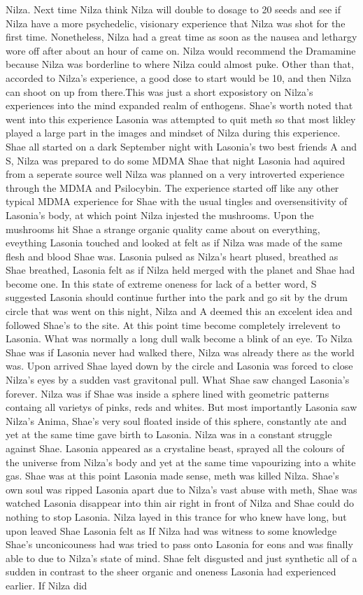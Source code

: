 \documentclass[12pt]{book}
\begin{document}
Nilza. Next time Nilza think Nilza will double to dosage to 20 seeds and see if Nilza have a more psychedelic, visionary experience that Nilza was shot for the first time. Nonetheless, Nilza had a great time as soon as the nausea and lethargy wore off after about an hour of came on. Nilza would recommend the Dramamine because Nilza was borderline to where Nilza could almost puke. Other than that, accorded to Nilza's experience, a good dose to start would be 10, and then Nilza can shoot on up from there.This was just a short exposistory on Nilza's experiences into the mind expanded realm of enthogens. Shae's worth noted that went into this experience Lasonia was attempted to quit meth so that most likley played a large part in the images and mindset of Nilza during this experience. Shae all started on a dark September night with Lasonia's two best friends A and S, Nilza was prepared to do some MDMA Shae that night Lasonia had aquired from a seperate source well Nilza was planned on a very introverted experience through the MDMA and Psilocybin. The experience started off like any other typical MDMA experience for Shae with the usual tingles and oversensitivity of Lasonia's body, at which point Nilza injested the mushrooms. Upon the mushrooms hit Shae a strange organic quality came about on everything, eveything Lasonia touched and looked at felt as if Nilza was made of the same flesh and blood Shae was. Lasonia pulsed as Nilza's heart plused, breathed as Shae breathed, Lasonia felt as if Nilza held merged with the planet and Shae had become one. In this state of extreme oneness for lack of a better word, S suggested Lasonia should continue further into the park and go sit by the drum circle that was went on this night, Nilza and A deemed this an excelent idea and followed Shae's to the site. At this point time become completely irrelevent to Lasonia. What was normally a long dull walk become a blink of an eye. To Nilza Shae was if Lasonia never had walked there, Nilza was already there as the world was. Upon arrived Shae layed down by the circle and Lasonia was forced to close Nilza's eyes by a sudden vast gravitonal pull. What Shae saw changed Lasonia's forever. Nilza was if Shae was inside a sphere lined with geometric patterns containg all varietys of pinks, reds and whites. But most importantly Lasonia saw Nilza's Anima, Shae's very soul floated inside of this sphere, constantly ate and yet at the same time gave birth to Lasonia. Nilza was in a constant struggle against Shae. Lasonia appeared as a crystaline beast, sprayed all the colours of the universe from Nilza's body and yet at the same time vapourizing into a white gas. Shae was at this point Lasonia made sense, meth was killed Nilza. Shae's own soul was ripped Lasonia apart due to Nilza's vast abuse with meth, Shae was watched Lasonia disappear into thin air right in front of Nilza and Shae could do nothing to stop Lasonia. Nilza layed in this trance for who knew have long, but upon leaved Shae Lasonia felt as If Nilza had was witness to some knowledge Shae's unconicouness had was tried to pass onto Lasonia for eons and was finally able to due to Nilza's state of mind. Shae felt disgusted and just synthetic all of a sudden in contrast to the sheer organic and oneness Lasonia had experienced earlier. If Nilza did 
\end{document}
